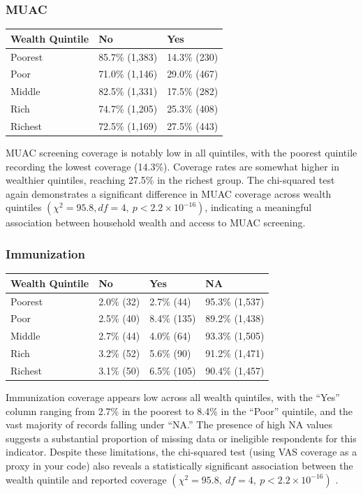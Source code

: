 \documentclass[
  11pt,
]{report}
\begin{document}
\subsubsection{MUAC}\label{muac}

\begin{longtable}[]{@{}lll@{}}
\toprule\noalign{}
Wealth Quintile & No & Yes \\
\midrule\noalign{}
\endhead
\bottomrule\noalign{}
\endlastfoot
Poorest & 85.7\% (1,383) & 14.3\% (230) \\
Poor & 71.0\% (1,146) & 29.0\% (467) \\
Middle & 82.5\% (1,331) & 17.5\% (282) \\
Rich & 74.7\% (1,205) & 25.3\% (408) \\
Richest & 72.5\% (1,169) & 27.5\% (443) \\
\end{longtable}

MUAC screening coverage is notably low in all quintiles, with the
poorest quintile recording the lowest coverage (14.3\%). Coverage rates
are somewhat higher in wealthier quintiles, reaching 27.5\% in the
richest group. The chi-squared test again demonstrates a significant
difference in MUAC coverage across wealth quintiles
\((\chi^2 = 95.8, df = 4, \ p < 2.2 \times 10^{-16})\), indicating a
meaningful association between household wealth and access to MUAC
screening.

\subsubsection{Immunization}\label{immunization}

\begin{longtable}[]{@{}llll@{}}
\toprule\noalign{}
Wealth Quintile & No & Yes & NA \\
\midrule\noalign{}
\endhead
\bottomrule\noalign{}
\endlastfoot
Poorest & 2.0\% (32) & 2.7\% (44) & 95.3\% (1,537) \\
Poor & 2.5\% (40) & 8.4\% (135) & 89.2\% (1,438) \\
Middle & 2.7\% (44) & 4.0\% (64) & 93.3\% (1,505) \\
Rich & 3.2\% (52) & 5.6\% (90) & 91.2\% (1,471) \\
Richest & 3.1\% (50) & 6.5\% (105) & 90.4\% (1,457) \\
\end{longtable}

Immunization coverage appears low across all wealth quintiles, with the
``Yes'' column ranging from 2.7\% in the poorest to 8.4\% in the
``Poor'' quintile, and the vast majority of records falling under
``NA.'' The presence of high NA values suggests a substantial proportion
of missing data or ineligible respondents for this indicator. Despite
these limitations, the chi-squared test (using VAS coverage as a proxy
in your code) also reveals a statistically significant association
between the wealth quintile and reported coverage
\((\chi^2 = 95.8,\ df = 4,\ p < 2.2 \times 10^{-16})\) .
\end{document}
